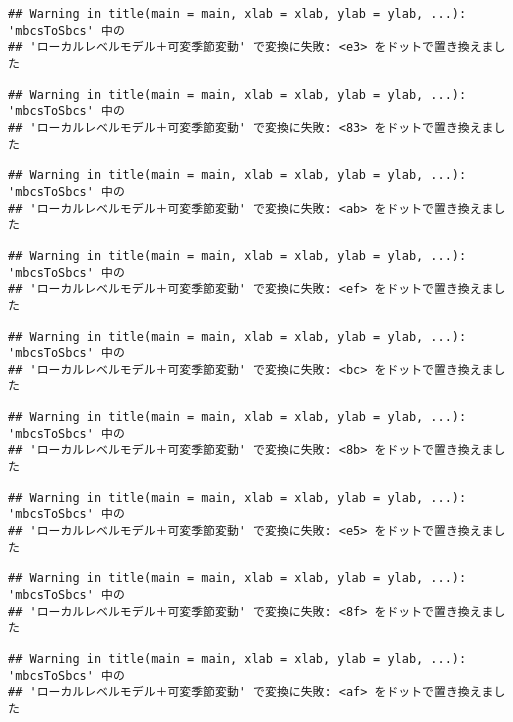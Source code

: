 \documentclass[]{article}
\begin{document}
\begin{verbatim}
## Warning in title(main = main, xlab = xlab, ylab = ylab, ...): 'mbcsToSbcs' 中の
## 'ローカルレベルモデル＋可変季節変動' で変換に失敗: <e3> をドットで置き換えました
\end{verbatim}

\begin{verbatim}
## Warning in title(main = main, xlab = xlab, ylab = ylab, ...): 'mbcsToSbcs' 中の
## 'ローカルレベルモデル＋可変季節変動' で変換に失敗: <83> をドットで置き換えました
\end{verbatim}

\begin{verbatim}
## Warning in title(main = main, xlab = xlab, ylab = ylab, ...): 'mbcsToSbcs' 中の
## 'ローカルレベルモデル＋可変季節変動' で変換に失敗: <ab> をドットで置き換えました
\end{verbatim}

\begin{verbatim}
## Warning in title(main = main, xlab = xlab, ylab = ylab, ...): 'mbcsToSbcs' 中の
## 'ローカルレベルモデル＋可変季節変動' で変換に失敗: <ef> をドットで置き換えました
\end{verbatim}

\begin{verbatim}
## Warning in title(main = main, xlab = xlab, ylab = ylab, ...): 'mbcsToSbcs' 中の
## 'ローカルレベルモデル＋可変季節変動' で変換に失敗: <bc> をドットで置き換えました
\end{verbatim}

\begin{verbatim}
## Warning in title(main = main, xlab = xlab, ylab = ylab, ...): 'mbcsToSbcs' 中の
## 'ローカルレベルモデル＋可変季節変動' で変換に失敗: <8b> をドットで置き換えました
\end{verbatim}

\begin{verbatim}
## Warning in title(main = main, xlab = xlab, ylab = ylab, ...): 'mbcsToSbcs' 中の
## 'ローカルレベルモデル＋可変季節変動' で変換に失敗: <e5> をドットで置き換えました
\end{verbatim}

\begin{verbatim}
## Warning in title(main = main, xlab = xlab, ylab = ylab, ...): 'mbcsToSbcs' 中の
## 'ローカルレベルモデル＋可変季節変動' で変換に失敗: <8f> をドットで置き換えました
\end{verbatim}

\begin{verbatim}
## Warning in title(main = main, xlab = xlab, ylab = ylab, ...): 'mbcsToSbcs' 中の
## 'ローカルレベルモデル＋可変季節変動' で変換に失敗: <af> をドットで置き換えました
\end{verbatim}
\end{document}
